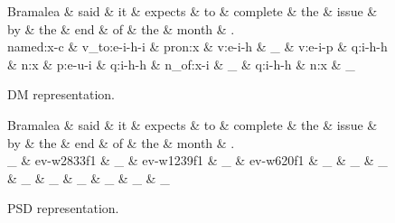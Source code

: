 \begin{figure}
    \centering
    \smaller[]
    \smaller[]
    \begin{dependency}[]
        \begin{deptext}[column sep=0.5em, row sep=.1ex]
            Bramalea \& said \& it \& expects \& to \& complete \& the \& issue \& by \& the \& end \& of \& the \& month \& . \\
            named:x-c \& v\_to:e-i-h-i \& pron:x \& v:e-i-h \& \_ \& v:e-i-p \& q:i-h-h \& n:x \& p:e-u-i \& q:i-h-h \& n\_of:x-i \& \_ \& q:i-h-h \& n:x \& \_ \\
        \end{deptext}
    \end{dependency}
    \caption{DM representation.}
    \label{DM}
\end{figure}

\begin{figure}
    \centering
    \smaller[]
    \begin{dependency}[]
        \begin{deptext}[column sep=0.2em, row sep=.1ex]
            Bramalea \& said \& it \& expects \& to \& complete \& the \& issue \& by \& the \& end \& of \& the \& month \& . \\
            \_ \& ev-w2833f1 \& \_ \& ev-w1239f1 \& \_ \& ev-w620f1 \& \_ \& \_ \& \_ \& \_ \& \_ \& \_ \& \_ \& \_ \& \_ \\
        \end{deptext}
    \end{dependency}
    \caption{PSD representation.}
    \label{PSD}
\end{figure}

\begin{displayquote}

\end{displayquote}

